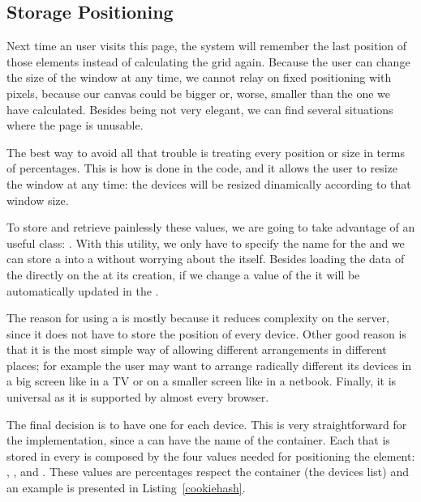 
\subsection{Storage Positioning} %
\label{sub:storage}

Next time an user visits this page, the system will remember the last position of those elements instead of calculating the grid again.
Because the user can change the size of the window at any time, we cannot relay on fixed positioning with pixels, because our canvas could be bigger or, worse, smaller than the one we have calculated.
Besides being not very elegant, we can find several situations where the page is unusable.

The best way to avoid all that trouble is treating every position or size in terms of percentages.
This is how is done in the code, and it allows the user to resize the window at any time: the devices will be resized dinamically according to that window size.

To store and retrieve painlessly these values, we are going to take advantage of an useful  class:  \cite{MooHashCookie}.
With this utility, we only have to specify the name for the  and we can store a  into a  without worrying about the  itself.
Besides loading the data of the  directly on the  at its creation, if we change a value of the  it will be automatically updated in the .

The reason for using a  is mostly because it reduces complexity on the server, since it does not have to store the position of every device.
Other good reason is that it is the most simple way of allowing different arrangements in different places; for example the user may want to arrange radically different its devices in a big screen like in a TV or on a smaller screen like in a netbook.
Finally, it is universal as it is supported by almost every browser.

The final decision is to have one  for each device.
This is very straightforward for the implementation, since a  can
have the name of the container.
Each  that is stored in every  is composed by the four
values needed for positioning the element: , ,
 and .
These values are percentages respect the container (the devices list) and an
 example is presented in Listing~\vref{cookiehash}.

